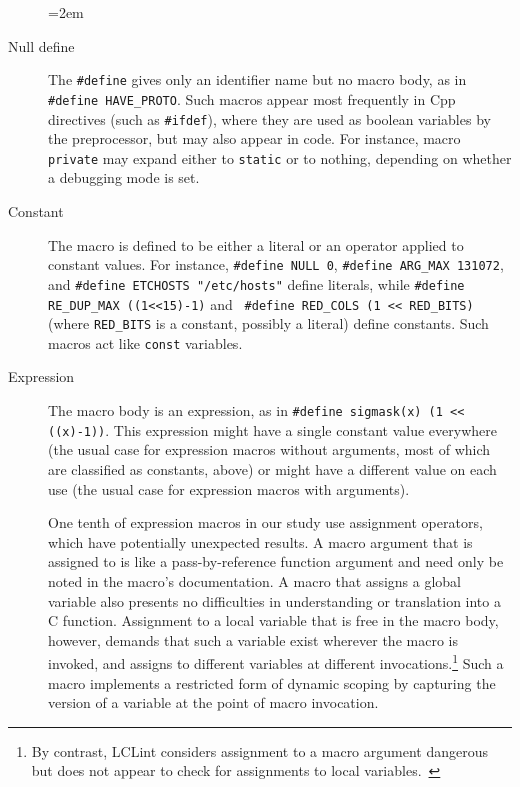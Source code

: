 \documentclass[11pt]{article}
\begin{document}
\begin{description}
  \sloppy
  \emergencystretch=2em

\item[Null define]  The {\tt \#define} gives only an
  identifier name but no macro body, as in {\tt \#define
  \verb|HAVE_PROTO|}\@.  Such macros appear most frequently in Cpp
directives (such as {\tt \#ifdef}), where they are used as boolean
variables by the preprocessor, but may also appear in code.  For instance,
macro {\tt private} may expand either to {\tt static} or to nothing,
depending on whether a debugging mode is set.

\item[Constant] The macro is defined to be either a literal or an operator
  applied to constant values.  For instance, {\tt \#define NULL 0}, {\tt \#define
  \verb|ARG_MAX| 131072}, and {\tt \#define ETCHOSTS "/etc/hosts"} define
literals, while {\tt \#define \verb|RE_DUP_MAX| ((1<<15)-1)} and {\tt
\#define \verb|RED_COLS| (1 << \verb|RED_BITS|)} (where \verb|RED_BITS| is
a constant, possibly a literal) define constants.  Such macros act like
{\tt const} variables.

\item[Expression]  The macro body is an expression, as in {\tt \#define
  sigmask(x) (1 << ((x)-1))}.  This expression might have a single constant
value everywhere (the usual case for expression macros without arguments,
most of which are classified as constants, above) or might have a
different value on each use (the usual case for expression macros with
arguments).

One tenth of expression macros in our study use assignment operators, which
have potentially unexpected results.  A macro argument that is assigned to
is like a pass-by-reference function argument and need only be noted in the
macro's documentation.  A macro that assigns a global variable also
presents no difficulties in understanding or translation into a C function.
Assignment to a local variable that is free in the macro body, however,
demands that such a variable exist wherever the macro is invoked, and
assigns to different variables at different invocations.\footnote{By
  contrast, LCLint considers assignment to a macro argument dangerous but
  does not appear to check for assignments to local
  variables.~\cite{Evans:LCLint}} Such a macro implements a restricted form
of dynamic scoping by capturing the version of a variable at the point of
macro invocation.



\end{description}
\end{document}
